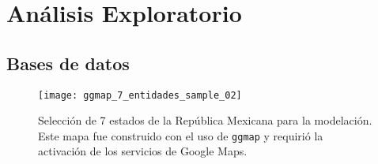 \chapter{Análisis Exploratorio}\label{chap:eda}

\section{Bases de datos}


\begin{figure}[H]
\centering
\texttt{[image: ggmap\_7\_entidades\_sample\_02]}  %
\caption{Selección de 7 estados de la República Mexicana para la modelación. Este mapa fue construido con el uso de \texttt{ggmap} \citep{Kahle2013ggmap} y requirió la activación de los servicios de Google Maps.}
\label{fig:selecc_entidades_01}
\end{figure}